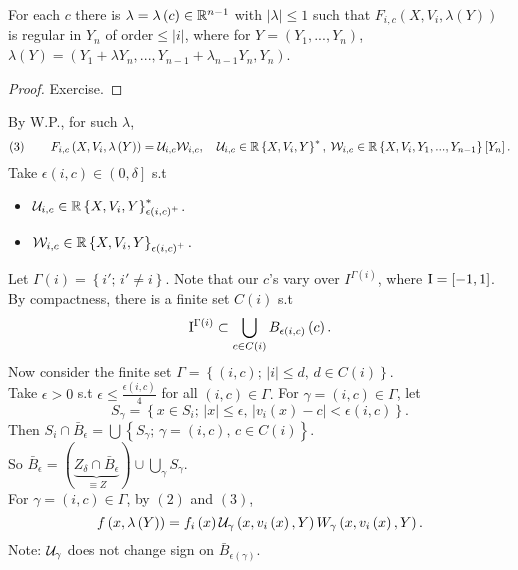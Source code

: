 \begin{claim*}
For each $c$ there is $\lambda=\lambda\left(c\right)\in\mathbb{R}^{n-1}$
with $\left|\lambda\right|\leq1$ such that $F_{i,c}\left(X,V_{i},\lambda\left(Y\right)\right)$
is regular in $Y_{n}$ of order$\leq\left|i\right|$, where for $Y=\left(Y_{1},...,Y_{n}\right)$,
$\lambda\left(Y\right)=\left(Y_{1}+\lambda Y_{n},...,Y_{n-1}+\lambda_{n-1}Y_{n},Y_{n}\right)$.\end{claim*}
\begin{proof}
Exercise.
\end{proof}
By W.P., for such $\lambda$,
\[
\left(3\right)\qquad F_{i,c}\left(X,V_{i},\lambda\left(Y\right)\right)=\mathcal{U}_{i,c}\mathcal{W}_{i,c},\quad\mathcal{U}_{i,c}\in\mathbb{R}\left\{ X,V_{i},Y\right\} ^{\ast},\:\mathcal{W}_{i,c}\in\mathbb{R}\left\{ X,V_{i},Y_{1},...,Y_{n-1}\right\} \left[Y_{n}\right].
\]
Take $\epsilon\left(i,c\right)\in\left(0,\delta\right]$ s.t 
\begin{itemize}
\item $\mathcal{U}_{i,c}\in\mathbb{R}\left\{ X,V_{i},Y\right\} _{\epsilon\left(i,c\right)^{+}}^{\ast}$.
\item $\mathcal{W}_{i,c}\in\mathbb{R}\left\{ X,V_{i},Y\right\} _{\epsilon\left(i,c\right)^{+}}.$
\end{itemize}
Let $\Gamma\left(i\right)=\left\{ i';\, i'\neq i\right\} $. Note
that our $c$'s vary over $I^{\Gamma\left(i\right)}$, where $\mathrm{I}=\left[-1,1\right]$.
By compactness, there is a finite set $C\left(i\right)$ s.t
\[
\mathrm{I}^{\Gamma\left(i\right)}\subset\bigcup_{c\in C\left(i\right)}B_{\epsilon\left(i,c\right)}\left(c\right).
\]
Now consider the finite set $\Gamma=\left\{ \left(i,c\right);\,\left|i\right|\leq d,\, d\in C\left(i\right)\right\} $.\\
Take $\epsilon>0$ s.t $\epsilon\leq\frac{\epsilon\left(i,c\right)}{4}$
for all $\left(i,c\right)\in\Gamma.$ For $\gamma=\left(i,c\right)\in\Gamma$,
let 
\[
S_{\gamma}=\left\{ x\in S_{i};\,\left|x\right|\leq\epsilon,\,\left|v_{i}\left(x\right)-c\right|<\epsilon\left(i,c\right)\right\} .
\]
Then $S_{i}\cap\bar{B}_{\epsilon}=\bigcup\left\{ S_{\gamma};\,\gamma=\left(i,c\right),\, c\in C\left(i\right)\right\} $.
\\
So $\bar{B}_{\epsilon}=\left(\underbrace{Z_{\delta}\cap\bar{B}_{\epsilon}}_{\equiv Z}\right)\cup\bigcup_{\gamma}S_{\gamma}$.\\
For $\gamma=\left(i,c\right)\in\Gamma$, by $\left(2\right)$ and
$\left(3\right)$,
\[
f\left(x,\lambda\left(Y\right)\right)=f_{i}\left(x\right)\mathcal{U}_{\gamma}\left(x,v_{i}\left(x\right),Y\right)W_{\gamma}\left(x,v_{i}\left(x\right),Y\right).
\]
Note: $\mathcal{U}_{\gamma}$ does not change sign on $\bar{B}_{\epsilon\left(\gamma\right)}$.
